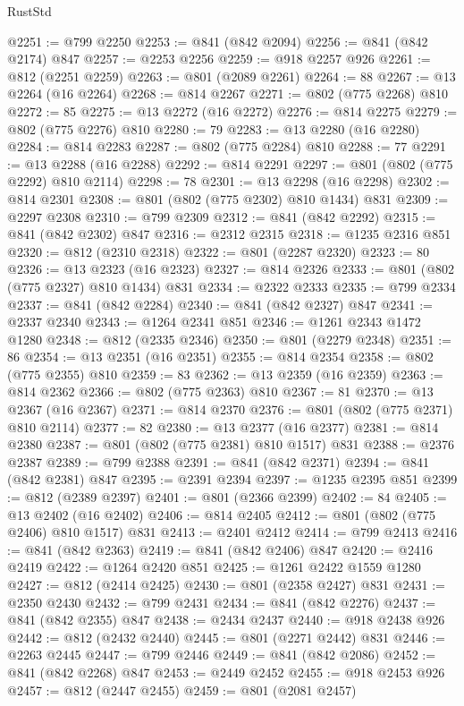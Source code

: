 \begin{lexlean}{RustStd}
\begin{coremodule}
{\begin{coremodule}
{{{{{@2251 := @799 @2250
@2253 := @841 (@842 @2094)
@2256 := @841 (@842 @2174) @847
@2257 := @2253 @2256
@2259 := @918 @2257 @926
@2261 := @812 (@2251 @2259)
@2263 := @801 (@2089 @2261)
@2264 := 88
@2267 := @13 @2264 (@16 @2264)
@2268 := @814 @2267
@2271 := @802 (@775 @2268) @810
@2272 := 85
@2275 := @13 @2272 (@16 @2272)
@2276 := @814 @2275
@2279 := @802 (@775 @2276) @810
@2280 := 79
@2283 := @13 @2280 (@16 @2280)
@2284 := @814 @2283
@2287 := @802 (@775 @2284) @810
@2288 := 77
@2291 := @13 @2288 (@16 @2288)
@2292 := @814 @2291
@2297 := @801 (@802 (@775 @2292) @810 @2114)
@2298 := 78
@2301 := @13 @2298 (@16 @2298)
@2302 := @814 @2301
@2308 := @801 (@802 (@775 @2302) @810 @1434) @831
@2309 := @2297 @2308
@2310 := @799 @2309
@2312 := @841 (@842 @2292)
@2315 := @841 (@842 @2302) @847
@2316 := @2312 @2315
@2318 := @1235 @2316 @851
@2320 := @812 (@2310 @2318)
@2322 := @801 (@2287 @2320)
@2323 := 80
@2326 := @13 @2323 (@16 @2323)
@2327 := @814 @2326
@2333 := @801 (@802 (@775 @2327) @810 @1434) @831
@2334 := @2322 @2333
@2335 := @799 @2334
@2337 := @841 (@842 @2284)
@2340 := @841 (@842 @2327) @847
@2341 := @2337 @2340
@2343 := @1264 @2341 @851
@2346 := @1261 @2343 @1472 @1280
@2348 := @812 (@2335 @2346)
@2350 := @801 (@2279 @2348)
@2351 := 86
@2354 := @13 @2351 (@16 @2351)
@2355 := @814 @2354
@2358 := @802 (@775 @2355) @810
@2359 := 83
@2362 := @13 @2359 (@16 @2359)
@2363 := @814 @2362
@2366 := @802 (@775 @2363) @810
@2367 := 81
@2370 := @13 @2367 (@16 @2367)
@2371 := @814 @2370
@2376 := @801 (@802 (@775 @2371) @810 @2114)
@2377 := 82
@2380 := @13 @2377 (@16 @2377)
@2381 := @814 @2380
@2387 := @801 (@802 (@775 @2381) @810 @1517) @831
@2388 := @2376 @2387
@2389 := @799 @2388
@2391 := @841 (@842 @2371)
@2394 := @841 (@842 @2381) @847
@2395 := @2391 @2394
@2397 := @1235 @2395 @851
@2399 := @812 (@2389 @2397)
@2401 := @801 (@2366 @2399)
@2402 := 84
@2405 := @13 @2402 (@16 @2402)
@2406 := @814 @2405
@2412 := @801 (@802 (@775 @2406) @810 @1517) @831
@2413 := @2401 @2412
@2414 := @799 @2413
@2416 := @841 (@842 @2363)
@2419 := @841 (@842 @2406) @847
@2420 := @2416 @2419
@2422 := @1264 @2420 @851
@2425 := @1261 @2422 @1559 @1280
@2427 := @812 (@2414 @2425)
@2430 := @801 (@2358 @2427) @831
@2431 := @2350 @2430
@2432 := @799 @2431
@2434 := @841 (@842 @2276)
@2437 := @841 (@842 @2355) @847
@2438 := @2434 @2437
@2440 := @918 @2438 @926
@2442 := @812 (@2432 @2440)
@2445 := @801 (@2271 @2442) @831
@2446 := @2263 @2445
@2447 := @799 @2446
@2449 := @841 (@842 @2086)
@2452 := @841 (@842 @2268) @847
@2453 := @2449 @2452
@2455 := @918 @2453 @926
@2457 := @812 (@2447 @2455)
@2459 := @801 (@2081 @2457)
}}}}}
\end{coremodule}}
\end{coremodule}
\end{lexlean}
